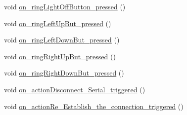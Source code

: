 \begin{DoxyCompactItemize}
void \mbox{\hyperlink{class_main_window_ac5c8ca012c0b479ca3b42a172df11f99}{on\+\_\+ring\+Light\+Off\+Button\+\_\+pressed}} ()
\item 
void \mbox{\hyperlink{class_main_window_aefd08ff26ec69cb1a8c2da298e414742}{on\+\_\+ring\+Left\+Up\+But\+\_\+pressed}} ()
\item 
void \mbox{\hyperlink{class_main_window_a125980000dd5d0e94dfc612b0d911267}{on\+\_\+ring\+Left\+Down\+But\+\_\+pressed}} ()
\item 
void \mbox{\hyperlink{class_main_window_a91f17268d2e2d4ac1b10c37a535a93fe}{on\+\_\+ring\+Right\+Up\+But\+\_\+pressed}} ()
\item 
void \mbox{\hyperlink{class_main_window_a2a0d4d64e7fe2ee99abce8e41eb4afd1}{on\+\_\+ring\+Right\+Down\+But\+\_\+pressed}} ()
\item 
void \mbox{\hyperlink{class_main_window_adac02082b520624b82e63d66eb2f1f57}{on\+\_\+action\+Disconnect\+\_\+\+Serial\+\_\+triggered}} ()
\item 
void \mbox{\hyperlink{class_main_window_abe15cc441416a5266df8770298aca76b}{on\+\_\+action\+Re\+\_\+\+Establish\+\_\+the\+\_\+connection\+\_\+triggered}} ()
\end{DoxyCompactItemize}
